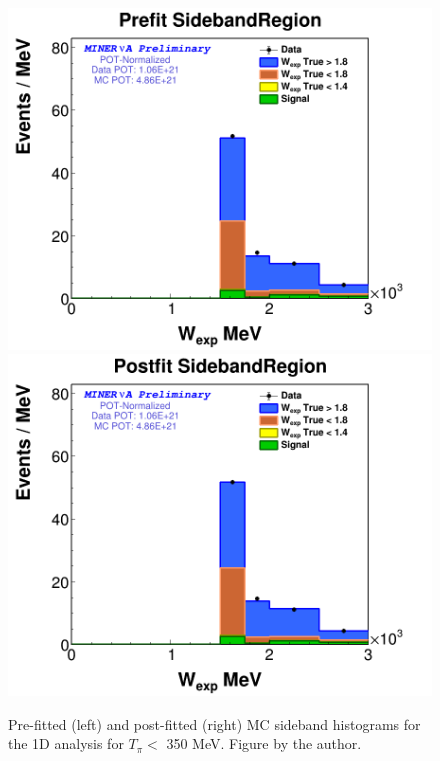 \begin{figure}
    \centering
    \includegraphics[scale=0.2]{Figures/Chapter4/BGStudies/PreWFit_wexp_fit_1Pi_PN_SidebandRegion_1DAnalysis.png}
    \includegraphics[scale=0.2]{Figures/Chapter4/BGStudies/PostWFit_wexp_fit_1Pi_PN_SidebandRegion_1DAnalysis.png}
    \caption{Pre-fitted (left) and post-fitted (right) MC sideband histograms for the 1D analysis for $T_\pi <$ 350 MeV. Figure by the author.}
    \label{fig:BgStudies:SidebandTunning:PrePosFit1DAnalysis}
\end{figure}

